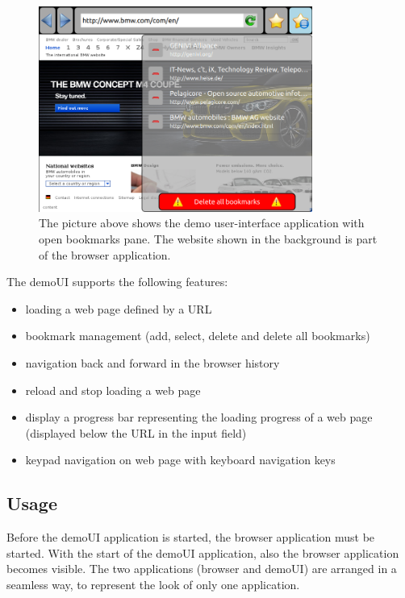 \documentclass{pelagicore}
\begin{document}
\begin{figure}[!ht]
    \center
    \includegraphics[width=0.8\textwidth]{demoui.png}
    \caption{The picture above shows the demo user-interface application with
             open bookmarks pane. The website shown in the background is part
             of the browser application.}
\end{figure}

The demoUI supports the following features:
\begin{itemize}
    \item loading a web page defined by a URL
    \item bookmark management (add, select, delete and delete all bookmarks)
    \item navigation back and forward in the browser history
    \item reload and stop loading a web page
    \item display a progress bar representing the loading progress of a web page
          (displayed below the URL in the input field)
    \item keypad navigation on web page with keyboard navigation keys
\end{itemize}

\subsection{Usage}
Before the demoUI application is started, the browser application must be
started. With the start of the demoUI application, also the browser application
becomes visible. The two applications (browser and demoUI) are arranged in a
seamless way, to represent the look of only one application.
\end{document}
